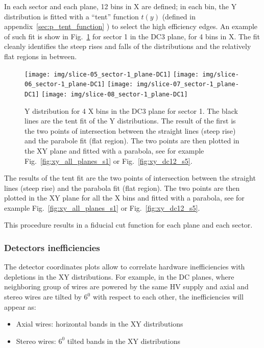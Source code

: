 In each sector and each plane, 12 bins in X are defined; in each bin, the Y distribution
is fitted with a ``tent'' function $t(y)$ (defined in appendix~\ref{sec:p_tent_function} ) to select the high efficiency edges.
An example of such fit is show in Fig.~\ref{fig:y_slices_s1} for sector 1 in the DC3 plane, for 4 bins in X.
The fit cleanly identifies the steep rises and falls of the distributions and the relatively flat regions in between.


\begin{figure}[h]
    \centering
    \texttt{[image: img/slice-05\_sector-1\_plane-DC1]}
    \texttt{[image: img/slice-06\_sector-1\_plane-DC1]}
    \texttt{[image: img/slice-07\_sector-1\_plane-DC1]}
    \texttt{[image: img/slice-08\_sector-1\_plane-DC1]}
    \caption{Y distribution for 4 X bins in the DC3 plane for sector 1. The black lines are the tent
    fit of the Y distributions. The result of the first is the two points of intersection between the straight
    lines (steep rise) and the parabole fit (flat region). The two points are then plotted in the XY plane and
    fitted with a parabola, see for example Fig.~\ref{fig:xy_all_planes_s1} or Fig.~\ref{fig:xy_dc12_s5}.}
    \label{fig:y_slices_s1}
\end{figure}

The results of the tent fit are the two points of intersection between the straight lines (steep rise) and the
parabola fit (flat region). The two points are then plotted in the XY plane for all the X bins and fitted with
a parabola, see for example Fig.~\ref{fig:xy_all_planes_s1} or Fig.~\ref{fig:xy_dc12_s5}.

This procedure results in a fiducial cut function for each plane and each sector.


\newpage

\subsubsection{Detectors inefficiencies}
The detector coordinates plots allow to correlate hardware inefficiencies with depletions in the XY distributions.
For example, in the DC planes, where neighboring group of wires are powered by the same HV supply and
axial and stereo wires are tilted by $6^0$ with respect to each other, the inefficiencies
will appear as:

\begin{itemize}
    \item Axial wires: horizontal bands in the XY distributions
    \item Stereo wires: $6^0$ tilted bands in the XY distributions
\end{itemize}

